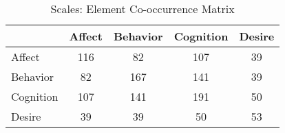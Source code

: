 \begin{table}
\begin{minipage}[t][\textheight][t]{\textwidth}

\caption{\label{tab:ScaleElementCooccurrences}Scales: Element Co-occurrence Matrix}
\begin{tabular}[t]{lcccc}
\toprule
  & Affect & Behavior & Cognition & Desire\\
\midrule
Affect & 116 & 82 & 107 & 39\\
Behavior & 82 & 167 & 141 & 39\\
Cognition & 107 & 141 & 191 & 50\\
Desire & 39 & 39 & 50 & 53\\
\bottomrule
\end{tabular}
\end{minipage}
\end{table}

